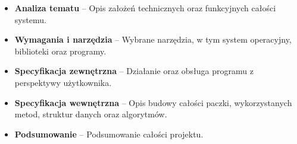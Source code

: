 \begin{itemize}
    \item \textbf{Analiza tematu} -- Opis założeń technicznych oraz funkcyjnych całości systemu. 
    \item \textbf{Wymagania i narzędzia} -- Wybrane narzędzia, w tym system operacyjny, biblioteki oraz programy. 
    \item \textbf{Specyfikacja zewnętrzna} -- Działanie oraz obsługa programu z perspektywy użytkownika. 
    \item \textbf{Specyfikacja wewnętrzna} -- Opis budowy całości paczki, wykorzystanych metod, struktur danych oraz algorytmów.
    \item \textbf{Podsumowanie} -- Podsumowanie całości projektu. \newline
\end{itemize}








